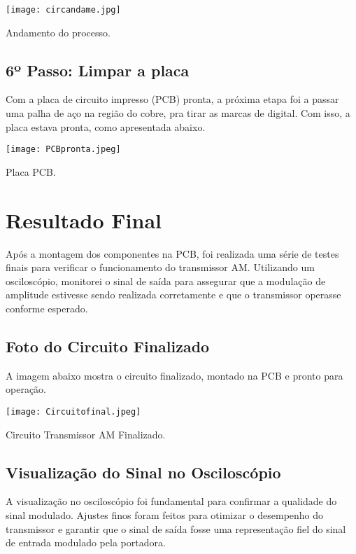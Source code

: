 \documentclass[
]{book}
\begin{document}
\texttt{[image: circandame.jpg]}

Andamento do processo.

\subsection{6º Passo: Limpar a placa}\label{uxba-passo-limpar-a-placa}

Com a placa de circuito impresso (PCB) pronta, a próxima etapa foi a passar uma palha de aço na região do cobre, pra tirar as marcas de digital. Com isso, a placa estava pronta, como apresentada abaixo.

\texttt{[image: PCBpronta.jpeg]}

Placa PCB.

\section{Resultado Final}\label{resultado-final-4}

Após a montagem dos componentes na PCB, foi realizada uma série de testes finais para verificar o funcionamento do transmissor AM. Utilizando um osciloscópio, monitorei o sinal de saída para assegurar que a modulação de amplitude estivesse sendo realizada corretamente e que o transmissor operasse conforme esperado.

\subsection{Foto do Circuito Finalizado}\label{foto-do-circuito-finalizado}

A imagem abaixo mostra o circuito finalizado, montado na PCB e pronto para operação.

\texttt{[image: Circuitofinal.jpeg]}

Circuito Transmissor AM Finalizado.

\subsection{Visualização do Sinal no Osciloscópio}\label{visualizauxe7uxe3o-do-sinal-no-osciloscuxf3pio}

A visualização no osciloscópio foi fundamental para confirmar a qualidade do sinal modulado. Ajustes finos foram feitos para otimizar o desempenho do transmissor e garantir que o sinal de saída fosse uma representação fiel do sinal de entrada modulado pela portadora.
\end{document}

